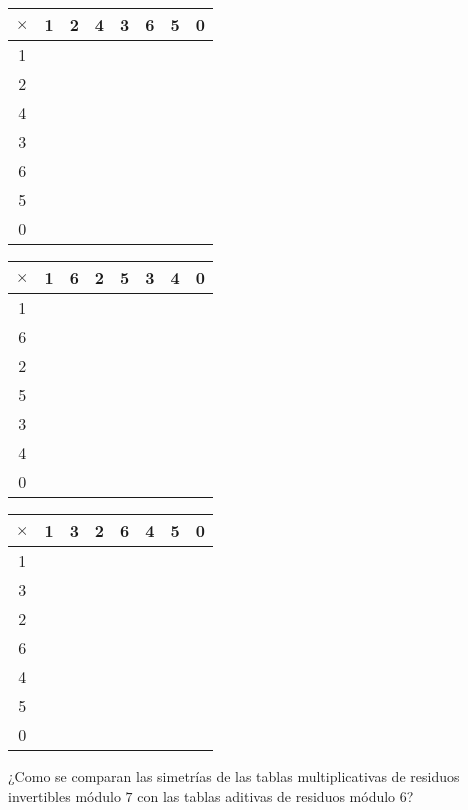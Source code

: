 \begin{ejercicio}
 \begin{tabular}{|c||c|c|c|c|c|c|c|} 
 \hline
  $\times$ & 1 & 2 & 4 & 3 & 6 & 5 & 0\\ 
  \hline
  \hline
  1 &  & & & & & &\\ 
  \hline
  2 &  & & & & & &\\
    \hline
  4 &  & & & & & &\\
      \hline
  3 &  & & & & & &\\ 
        \hline
  6 &  & & & & & &\\ 
          \hline
  5 &  & & & & & &\\ 
            \hline
  0 &  & & & & & &\\ 
  \hline
\end{tabular}
\hspace{.5cm}
 \begin{tabular}{|c||c|c|c|c|c|c|c|} 
 \hline
  $\times$ & 1 & 6 & 2 & 5 & 3 & 4 & 0\\ 
  \hline
  \hline
  1 &  & & & & & &\\ 
  \hline
  6 &  & & & & & &\\
    \hline
  2 &  & & & & & &\\
      \hline
  5 &  & & & & & &\\ 
        \hline
  3 &  & & & & & &\\ 
          \hline
  4 &  & & & & & &\\ 
            \hline
  0 &  & & & & & &\\ 
  \hline
\end{tabular}
\hspace{.5cm}
 \begin{tabular}{|c||c|c|c|c|c|c|c|} 
 \hline
  $\times$ & 1 & 3 & 2 & 6 & 4 & 5 & 0\\ 
  \hline
  \hline
  1 &  & & & & & &\\ 
  \hline
  3 &  & & & & & &\\
    \hline
  2 &  & & & & & &\\
      \hline
  6 &  & & & & & &\\ 
        \hline
  4 &  & & & & & &\\ 
          \hline
  5 &  & & & & & &\\ 
            \hline
  0 &  & & & & & &\\ 
  \hline
\end{tabular}

¿Como se comparan las simetrías de las tablas multiplicativas de residuos invertibles módulo $7$ con las tablas aditivas de residuos módulo $6$?
\end{ejercicio}

